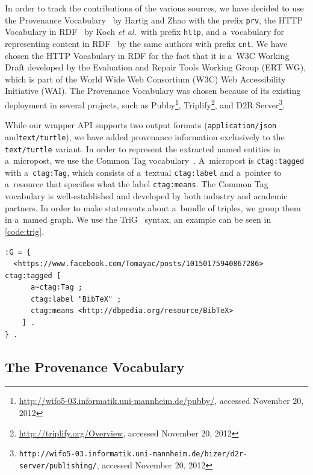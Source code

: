 In order to track the contributions of the various sources,
we have decided to use the Provenance
Vocabulary~\cite{hartig2012provenance}
by Hartig and Zhao with the prefix \texttt{prv},
the HTTP Vocabulary in RDF~\cite{koch2011http}
by Koch \emph{et al.}\ with prefix \texttt{http},
and a~vocabulary for representing content in
RDF~\cite{koch2011content}
by the same authors with prefix \texttt{cnt}.
We have chosen the HTTP Vocabulary in RDF for the fact that
it is a~W3C Working Draft developed by the
Evaluation and Repair Tools Working Group (ERT WG),
which is part of the World Wide Web Consortium (W3C)
Web Accessibility Initiative (WAI).
The Provenance Vocabulary was chosen because of its existing
deployment in several projects, such as
Pubby\footnote{\url{http://wifo5-03.informatik.uni-mannheim.de/pubby/},
accessed November 20, 2012},
Triplify\footnote{\url{http://triplify.org/Overview},
accessed November 20, 2012},
and D2R
Server\footnote{\texttt{http://wifo5-03.informatik.uni-mannheim.de/bizer/d2r-server/publishing/},
accessed November 20, 2012}.

While our wrapper API supports two output formats
(\texttt{application/json} and\linebreak \texttt{text/turtle}),
we have added provenance information exclusively to the
\texttt{text/turtle} variant.
In order to represent the extracted named entities in a~micropost,
we use the Common Tag vocabulary~\cite{tori2009commontag}.
A~micropost is \texttt{ctag:tagged} with a~\texttt{ctag:Tag},
which consists of a~textual \texttt{ctag:label} and a~pointer
to a~resource that specifies what the label \texttt{ctag:means}.
The Common Tag vocabulary is well-established and developed by
both industry and academic partners.
In order to make statements about a~bundle of triples,
we group them in a~named graph.
We use the TriG~\cite{bizer2007trig} syntax,
an example can be seen in \autoref{code:trig}.

\begin{lstlisting}[caption={Example named graph in TriG syntax.},
  label={code:trig}]
:G = {
  <https://www.facebook.com/Tomayac/posts/10150175940867286> ctag:tagged [
      a~ctag:Tag ;
      ctag:label "BibTeX" ;
      ctag:means <http://dbpedia.org/resource/BibTeX>
    ] .
} .
\end{lstlisting}

\subsection{The Provenance Vocabulary}
\label{sec:provenance}

